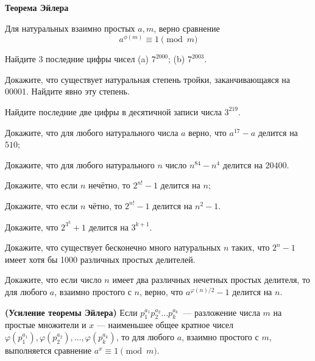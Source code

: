 \documentclass{article}
\begin{document}
    \large

    \begin{center}
        \textbf{Теорема Эйлера}
    \end{center}

    \begin{theorem}[Эйлера]
        Для натуральных взаимно простых $a, m$, верно сравнение \[a^{\phi(m)} \equiv 1 \pmod m\]
    \end{theorem}

    \begin{enumerate_boxed}

        \item Найдите $3$ последние цифры чисел (a) $7^{2000}$; (b) $7^{2003}$.

        \item Докажите, что существует натуральная степень тройки, заканчивающаяся на 00001.
        Найдите явно эту степень.

        \item Найдите последние две цифры в десятичной записи числа $3^{219}$.

        \item Докажите, что для любого натурального числа $a$ верно, что $a^{17} - a$ делится на $510$;

        \item Докажите, что для любого натурального $n$ число $n^{84} - n^4$ делится на $20400$.

        \item Докажите, что если $n$ нечётно, то $2^{n!} - 1$ делится на $n$;

        \item Докажите, что если $n$ чётно, то $2^{n!} - 1$ делится на $n^2 - 1$.

        \item Докажите, что $2^{3^k} + 1$ делится на $3^{k + 1}$.

        \item Докажите, что существует бесконечно много натуральных $n$ таких, что $2^n - 1$ имеет хотя бы 1000 различных простых делителей.

        \item Докажите, что если число $n$ имеет два различных нечетных простых делителя, то для любого $a$, взаимно простого с $n$, верно, что $a^{\varphi(n) / 2} - 1$ делится на $n$.

        \item \textbf{(Усиление теоремы Эйлера)} Если $p_1^{a_1}p_2^{a_2}\ldots p_k^{a_k}$~--- разложение числа $m$ на простые множители и $x$ --- наименьшее общее кратное чисел $\varphi(p_1^{a_1}), \varphi(p_2^{a_2}),\ldots, \varphi(p_k^{a_k})$, то для любого $a$, взаимно простого с $m$, выполняется сравнение $a^x \equiv 1\pmod m$.


\end{enumerate_boxed}
\end{document}
